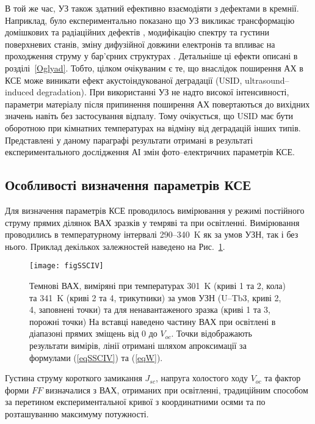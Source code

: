 В той же час, УЗ також здатний ефективно взаємодіяти з дефектами в кремнії.
Наприклад, було експериментально показано що УЗ викликає трансформацію домішкових та радіаційних дефектів \cite{Korotchenkov1995,Ostapenko1995,UST:Medvid,YOlikh:SupMicr},
модифікацію спектру \cite{Zaver:2008} та густини \cite{Mirsagatov} поверхневих станів,
зміну дифузійної довжини електронів \cite{Ostapenko1999,Ostrovskii2001}
та впливає на проходження струму у бар'єрних структурах \cite{Davletova2009,Davletova2008,YOlikh2005}.
Детальніше ці ефекти описані в розділі~\ref{Oglyad}.
Тобто, цілком очікуваним є те, що внаслідок поширення АХ в КСЕ може виникати ефект акустоіндукованої деградації (USID, ultrasound--induced degradation).
При використанні УЗ не надто високої інтенсивності, параметри матеріалу після припинення поширення АХ повертаються до вихідних значень \cite{Ostapenko1999,Ostrovskii2001,Korotchenkov1995} навіть без застосування відпалу.
Тому очікується, що USID має бути оборотною при кімнатних температурах на відміну від деградацій інших типів.
Представлені у даному параграфі результати отримані в результаті експериментального дослідження АІ змін фото--електричних параметрів КСЕ.

\subsection{Особливості визначення параметрів КСЕ\label{sbSSCMethod}}
Для визначення параметрів КСЕ проводилось вимірювання у режимі постійного струму прямих ділянок ВАХ зразків у темряві та при освітленні.
Вимірювання проводились в температурному інтервалі  290--340~K як за умов УЗН, так і без нього.
Приклад декількох залежностей наведено на Рис.~\ref{figSSCIV}.

\begin{figure}
\center
\texttt{[image: figSSCIV]}%
\caption{\label{figSSCIV}
Темнові ВАХ, виміряні при температурах 301~K (криві 1 та 2, кола) та 341~K (криві 2 та 4, трикутники)
за умов УЗН (U--Tb3, криві 2, 4, заповнені точки) та для ненавантаженого зразка (криві 1 та 3, порожні точки)
На вставці наведено частину ВАХ при освітлені в діапазоні прямих зміщень від 0 до $V_{oc}$.
Точки відображають результати вимірів, лінії отримані шляхом апроксимації за формулами (\ref{eqSSCIV}) та (\ref{eqW}).
}%
\end{figure}

Густина струму короткого замикання $J_{sc}$, напруга холостого ходу $V_{oc}$ та фактор форми $F\!F$ визначалися з ВАХ, отриманих при освітленні,
традиційним способом за перетином експериментальної кривої з координатними осями  та по розташуванню максимуму потужності.

